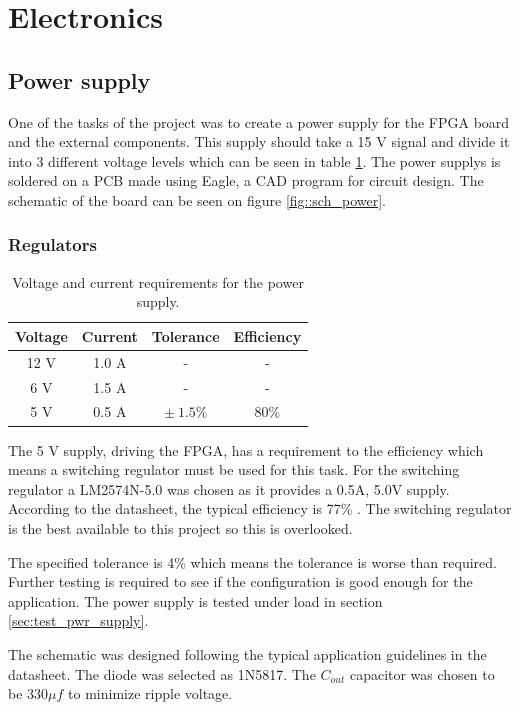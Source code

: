 \section{Electronics}
\subsection{Power supply}
One of the tasks of the project was to create a power supply for the FPGA board and the external components. 
This supply should take a 15 V signal and divide it into 3 different voltage levels which can be seen in table \ref{tab::power_req}. 
The power supplys is soldered on a PCB made using Eagle, a CAD program for circuit design. 
The schematic of the board can be seen on figure \ref{fig::sch_power}.
\subsubsection{Regulators}
\begin{table}
 \vspace{5 pt}
 \begin{tabular}{cccc}
  Voltage & Current & Tolerance      & Efficiency \\ \toprule
  12 V    & 1.0 A   & -              & -          \\
  6 V     & 1.5 A   & -              & -          \\
  5 V     & 0.5 A   & $\pm\ 1.5 \%$  & 80\%       \\
  \bottomrule
 \end{tabular}
\caption{Voltage and current requirements for the power supply.}
\label{tab::power_req}
 \vspace{5 pt}
\end{table}
The 5 V supply, driving the FPGA, has a requirement to the efficiency which means a switching regulator must be used for this task. 
For the switching regulator a LM2574N-5.0 was chosen as it provides a 0.5A, 5.0V supply.
According to the datasheet, the typical efficiency is 77\% \cite{ds:LM2574N}. 
The switching regulator is the best available to this project so this is overlooked.

The specified tolerance is 4\% which means the tolerance is worse than required. Further testing is required to see if the configuration is good enough for the application\cite[p. 1]{ds:LM2574N}.
The power supply is tested under load in section \ref{sec:test_pwr_supply}.

The schematic was designed following the typical application guidelines in the datasheet.
The diode was selected as 1N5817\cite[p. 17]{ds:LM2574N}. 
The $C_{out}$ capacitor was chosen to be $330\mu f$ to minimize ripple voltage\cite[p. 19]{ds:LM2574N}.

